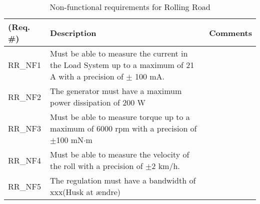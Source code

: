 \begin{table}[h!]
	\centering
	\begin{tabular}{|p{2 cm}|p{7 cm}|p{4 cm}|}
		\hline
		\textbf{(Req. \#)} & \textbf{Description} & \textbf{Comments} \\\hline
		RR\_NF1	& Must be able to measure the current in the Load System up to a maximum of 21 A with a precision of $\pm$ 100 mA. &   \\\hline
		RR\_NF2	& The generator must have a maximum power dissipation of 200 W &   \\\hline
		RR\_NF3	& Must be able to measure torque up to a maximum of 6000 rpm with a precision of $\pm$100 mN$\cdot$m  &   \\\hline
		RR\_NF4	& Must be able to measure the velocity of the roll with a precision of $\pm$2 km/h. &   \\\hline
		RR\_NF5	& The regulation must have a bandwidth of xxx\fxnote(Husk at ændre) &   \\\hline
	\end{tabular}
	\label{Nonfunctional:RollingRoad}
	\caption{Non-functional requirements for Rolling Road}
\end{table}